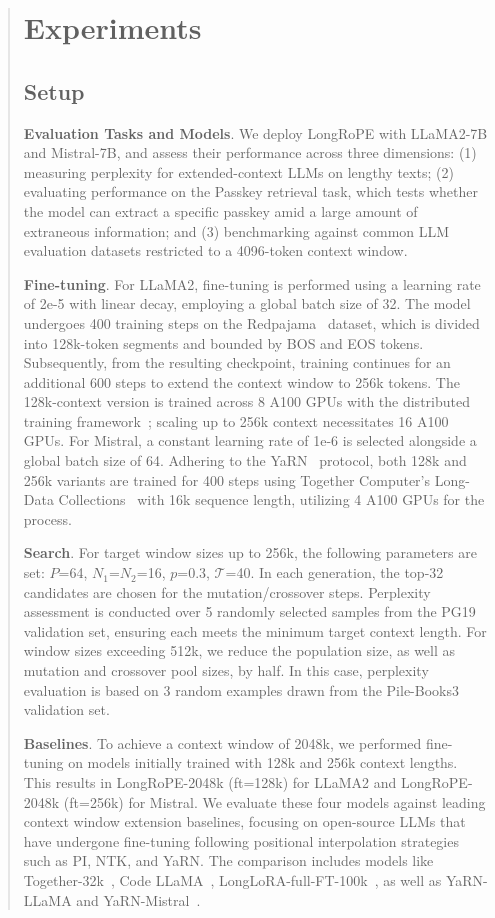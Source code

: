 \begin{abstract}
 \section{Experiments}

\label{sec:exp}
\subsection{Setup}
\textbf{Evaluation Tasks and Models}. We deploy LongRoPE with LLaMA2-7B and Mistral-7B, and assess their performance across three dimensions: (1) measuring perplexity for extended-context LLMs on lengthy texts; (2) evaluating performance on the Passkey retrieval task, which tests whether the model can extract a specific passkey amid a large amount of extraneous information; and (3) benchmarking against common LLM evaluation datasets restricted to a 4096-token context window.

\textbf{Fine-tuning}. For LLaMA2, fine-tuning is performed using a learning rate of 2e-5 with linear decay, employing a global batch size of 32. The model undergoes 400 training steps on the Redpajama~\cite{redpajama} dataset, which is divided into 128k-token segments and bounded by BOS and EOS tokens. Subsequently, from the resulting checkpoint, training continues for an additional 600 steps to extend the context window to 256k tokens. The 128k-context version is trained across 8 A100 GPUs with the distributed training framework~\cite{cube}; scaling up to 256k context necessitates 16 A100 GPUs. For Mistral, a constant learning rate of 1e-6 is selected alongside a global batch size of 64. Adhering to the YaRN~\cite{yarn} protocol, both 128k and 256k variants are trained for 400 steps using Together Computer's Long-Data Collections~\cite{mistraldata} with 16k sequence length, utilizing 4 A100 GPUs for the process.

\textbf{Search}. For target window sizes up to 256k, the following parameters are set: $P$=64, $N_1$=$N_2$=16, $p$=0.3, $\mathcal{T}$=40. In each generation, the top-32 candidates are chosen for the mutation/crossover steps. Perplexity assessment is conducted over 5 randomly selected samples from the PG19 validation set, ensuring each meets the minimum target context length. For window sizes exceeding 512k, we reduce the population size, as well as mutation and crossover pool sizes, by half. In this case, perplexity evaluation is based on 3 random examples drawn from the Pile-Books3~\cite{pile} validation set.

\textbf{Baselines}. To achieve a context window of 2048k, we performed fine-tuning on models initially trained with 128k and 256k context lengths. This results in LongRoPE-2048k (ft=128k) for LLaMA2 and LongRoPE-2048k (ft=256k) for Mistral. We evaluate these four models against leading context window extension baselines, focusing on open-source LLMs that have undergone fine-tuning following positional interpolation strategies such as PI, NTK, and YaRN. The comparison includes models like Together-32k~\cite{together}, Code LLaMA~\cite{codellama}, LongLoRA-full-FT-100k~\cite{longlora}, as well as YaRN-LLaMA and YaRN-Mistral~\cite{yarn}.


\end{abstract}
